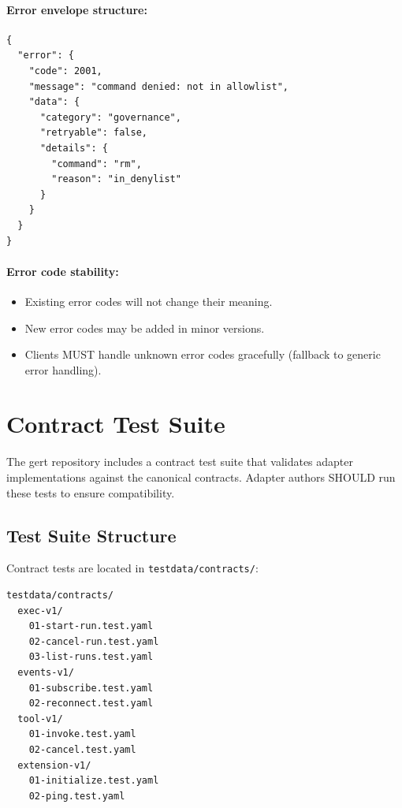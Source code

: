 \paragraph{Error envelope structure:}

\begin{verbatim}
{
  "error": {
    "code": 2001,
    "message": "command denied: not in allowlist",
    "data": {
      "category": "governance",
      "retryable": false,
      "details": {
        "command": "rm",
        "reason": "in_denylist"
      }
    }
  }
}
\end{verbatim}

\paragraph{Error code stability:}

\begin{itemize}
  \item Existing error codes will not change their meaning.
  \item New error codes may be added in minor versions.
  \item Clients MUST handle unknown error codes gracefully (fallback to generic
        error handling).
\end{itemize}

\section{Contract Test Suite}
\label{sec:contract-test-suite}

The gert repository includes a contract test suite that validates adapter
implementations against the canonical contracts.  Adapter authors SHOULD run
these tests to ensure compatibility.

\subsection{Test Suite Structure}

Contract tests are located in \texttt{testdata/contracts/}:

\begin{verbatim}
testdata/contracts/
  exec-v1/
    01-start-run.test.yaml
    02-cancel-run.test.yaml
    03-list-runs.test.yaml
  events-v1/
    01-subscribe.test.yaml
    02-reconnect.test.yaml
  tool-v1/
    01-invoke.test.yaml
    02-cancel.test.yaml
  extension-v1/
    01-initialize.test.yaml
    02-ping.test.yaml
\end{verbatim}


